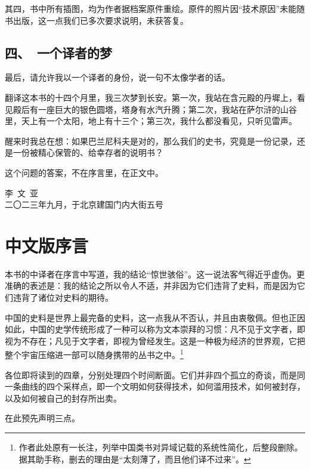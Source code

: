 其四，书中所有插图，均为作者据档案原件重绘。原件的照片因“技术原因”未能随书出版，这一点我们已多次要求说明，未获答复。

\section*{四、\ 一个译者的梦}

最后，请允许我以一个译者的身份，说一句不太像学者的话。

翻译这本书的十四个月里，我三次梦到长安。第一次，我站在含元殿的丹墀上，看见殿后有一座巨大的银色圆塔，塔身有水汽升腾；第二次，我站在萨尔浒的山谷里，天上有一个太阳，地上有十三个；第三次，我什么都没看见，只听见雷声。

醒来时我总在想：如果巴兰尼科夫是对的，那么我们的史书，究竟是一份记录，还是一份被精心保管的、给幸存者的说明书？

这个问题的答案，不在序言里，在正文中。

\vspace{12mm}
\begin{flushright}
{\small 李\ 文\ 亚}\\[2pt]
{\footnotesize\color{pencil} 二〇二三年九月，于北京建国门内大街五号}
\end{flushright}

\clearpage
\chapter*{中文版序言}

\noindent
本书的中译者在序言中写道，我的结论“惊世骇俗”。这一说法客气得近乎虚伪。更准确的表述是：我的结论之所以令人不适，并非因为它们违背了史料，而是因为它们违背了诸位对史料的期待。

中国的史料是世界上最完备的史料，这一点我从不否认，并且由衷敬佩。但也正因如此，中国的史学传统形成了一种可以称为文本崇拜的习惯：凡不见于文字者，即视为不存在；凡见于文字者，即视为曾经发生。这是一种极为经济的世界观，它把整个宇宙压缩进一部可以随身携带的丛书之中。\footnote{作者此处原有一长注，列举中国类书对异域记载的系统性简化，后整段删除。据其助手称，删去的理由是“太刻薄了，而且他们译不过来”。}

各位即将读到的四章，分别处理四个时间断面。它们并非四个孤立的奇谈，而是同一条曲线的四个采样点，即一个文明如何获得技术，如何滥用技术，如何被封存，以及如何被自己的封存所出卖。

在此预先声明三点。

